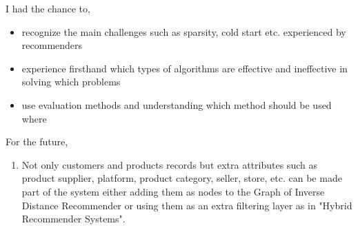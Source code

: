 I had the chance to,
\begin{itemize}
	\item recognize the main challenges such as sparsity, cold start etc. experienced by recommenders 
	\item experience firsthand which types of algorithms are effective and ineffective in solving which problems 
	\item use evaluation methods and understanding which method should be used where
\end{itemize}
For the future,
\begin{enumerate}
	\item Not only customers and products records but extra attributes such as product supplier, platform, product category, seller, store, etc. can be made part of the system either adding them as nodes to the Graph of Inverse Distance Recommender or using them as an extra filtering layer as in "Hybrid Recommender Systems".
\end{enumerate}